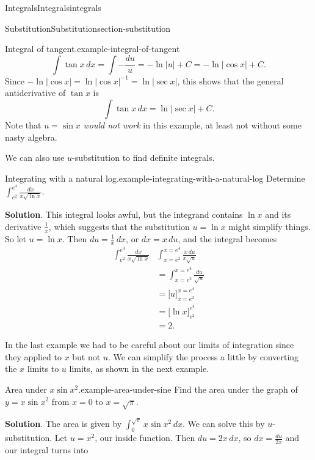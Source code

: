 \documentclass[oneside,10pt,]{book}
\numberwithin{equation}{section}
\begin{document}
\begin{chapterptx}{Integrals}{}{Integrals}{}{}{integrals}
\begin{sectionptx}{Substitution}{}{Substitution}{}{}{section-substitution}
\begin{example}{Integral of tangent.}{example-integral-of-tangent}
\begin{equation*}
\int\tan x\,dx = \int-\frac{du}{u} = -\ln|u| + C = -\ln|\cos x|+C.
\end{equation*}
Since \(-\ln|\cos x| = \ln|\cos x|^{-1} = \ln|\sec x|\), this shows that the general antiderivative of \(\tan x\) is%
\begin{equation*}
\int \tan x\,dx = \ln|\sec x| + C.
\end{equation*}
Note that \(u = \sin x\) \emph{would not work} in this example, at least not without some nasty algebra.%
\end{example}
\hypertarget{p-488}{}%
We can also use \(u\)-substitution to find definite integrals.%
\begin{example}{Integrating with a natural log.}{example-integrating-with-a-natural-log}%
\hypertarget{p-489}{}%
Determine \(\int_{e^{2}}^{e^{4}}\frac{dx}{x\sqrt{\ln x}}\).%
\par\smallskip%
\noindent\textbf{Solution}.\hypertarget{solution-108}{}\quad%
\hypertarget{p-490}{}%
This integral looks awful, but the integrand contains \(\ln x\) and its derivative \(\frac{1}{x}\), which suggests that the substitution \(u = \ln x\) might simplify things. So let \(u = \ln x\). Then \(du = \frac{1}{x}\,dx\), or \(dx = x\,du\), and the integral becomes%
\begin{align*}
\int_{e^{2}}^{e^{4}}\frac{dx}{x\sqrt{\ln x}} & \int_{x=e^{2}}^{x=e^{4}}\frac{x\,du}{x\sqrt{u}} \\
& = \int_{x=e^{2}}^{x=e^{4}}\frac{du}{\sqrt{u}} \\
& = \Big[u\Big]_{x=e^{2}}^{x=e^{4}} \\
& = \Big[\ln x\Big]_{e^{2}}^{e^{4}} \\
& = 2. 
\end{align*}
%
\end{example}
\hypertarget{p-491}{}%
In the last example we had to be careful about our limits of integration since they applied to \(x\) but not \(u\). We can simplify the process a little by converting the \(x\) limits to \(u\) limits, as shown in the next example.%
\begin{example}{Area under \(x\sin x^{2}\).}{example-area-under-sine}%
\hypertarget{p-492}{}%
Find the area under the graph of \(y = x\sin x^{2}\) from \(x=0\) to \(x = \sqrt{\pi}\).%
\par\smallskip%
\noindent\textbf{Solution}.\hypertarget{solution-109}{}\quad%
\hypertarget{p-493}{}%
The area is given by \(\int_{0}^{\sqrt{\pi}}x\sin x^{2}\,dx\). We can solve this by \(u\)-substitution. Let \(u = x^{2}\), our inside function. Then \(du = 2x\,dx\), so \(dx = \frac{du}{2x}\) and our integral turns into%

\end{example}
\end{sectionptx}
\end{chapterptx}
\end{document}
